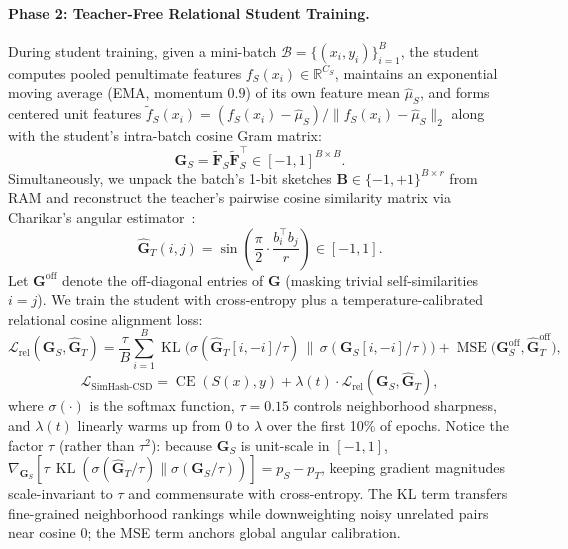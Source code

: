 \documentclass{article}
\begin{document}
\paragraph{Phase 2: Teacher-Free Relational Student Training.}
During student training, given a mini-batch $\mathcal{B} = \{(x_i, y_i)\}_{i=1}^B$, the student computes pooled penultimate features $f_S(x_i)\in\mathbb{R}^{C_S}$, maintains an exponential moving average (EMA, momentum $0.9$) of its own feature mean $\hat{\mu}_S$, and forms centered unit features $\tilde{f}_S(x_i) = (f_S(x_i)-\hat{\mu}_S)/\|f_S(x_i)-\hat{\mu}_S\|_2$ along with the student's intra-batch cosine Gram matrix:
\begin{equation}
    \mathbf{G}_S = \tilde{\mathbf{F}}_S \tilde{\mathbf{F}}_S^\top \in [-1, 1]^{B\times B}.
\end{equation}
Simultaneously, we unpack the batch's 1-bit sketches $\mathbf{B}\in\{-1,+1\}^{B\times r}$ from RAM and reconstruct the teacher's pairwise cosine similarity matrix via Charikar's angular estimator~\citep{charikar2002similarity}:
\begin{equation}
    \hat{\mathbf{G}}_T(i, j) = \sin\!\left(\frac{\pi}{2}\cdot\frac{b_i^\top b_j}{r}\right) \in [-1, 1].
\end{equation}
Let $\mathbf{G}^{\text{off}}$ denote the off-diagonal entries of $\mathbf{G}$ (masking trivial self-similarities $i=j$). We train the student with cross-entropy plus a temperature-calibrated relational cosine alignment loss:
\begin{equation}
    \mathcal{L}_{\text{rel}}(\mathbf{G}_S, \hat{\mathbf{G}}_T) = \frac{\tau}{B}\sum_{i=1}^B \operatorname{KL}\!\Big(\sigma(\hat{\mathbf{G}}_T[i, -i]/\tau) \,\big\|\, \sigma(\mathbf{G}_S[i, -i]/\tau)\Big) + \operatorname{MSE}\!\big(\mathbf{G}_S^{\text{off}}, \hat{\mathbf{G}}_T^{\text{off}}\big),
\label{eq:rel_loss}
\end{equation}
\begin{equation}
    \mathcal{L}_{\text{SimHash-CSD}} = \operatorname{CE}(S(x), y) + \lambda(t)\cdot \mathcal{L}_{\text{rel}}(\mathbf{G}_S, \hat{\mathbf{G}}_T),
\label{eq:total_loss}
\end{equation}
where $\sigma(\cdot)$ is the softmax function, $\tau = 0.15$ controls neighborhood sharpness, and $\lambda(t)$ linearly warms up from $0$ to $\lambda$ over the first 10\% of epochs. Notice the factor $\tau$ (rather than $\tau^2$): because $\mathbf{G}_S$ is unit-scale in $[-1,1]$, $\nabla_{\mathbf{G}_S}[\tau\,\operatorname{KL}(\sigma(\hat{\mathbf{G}}_T/\tau)\|\sigma(\mathbf{G}_S/\tau))] = p_S - p_T$, keeping gradient magnitudes scale-invariant to $\tau$ and commensurate with cross-entropy. The KL term transfers fine-grained neighborhood rankings while downweighting noisy unrelated pairs near cosine $0$; the MSE term anchors global angular calibration.
\end{document}
